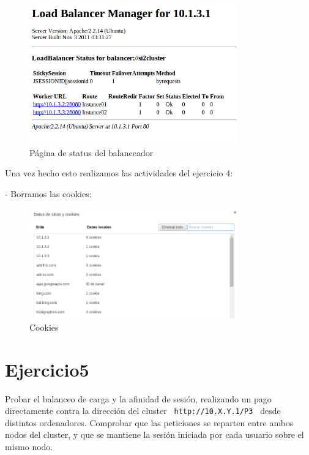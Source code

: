 \documentclass[a4paper, 10pt]{article}
\begin{document}
\begin{figure}[hbtp]
	\centering
	\includegraphics[width=0.8\textwidth]{../../P3/pantallazos/manager.png}
	\caption { Página de status del balanceador }
\end{figure}


Una vez hecho esto realizamos las actividades del ejercicio 4:

- Borramos las cookies:
\begin{figure}[hbtp]
	\centering
	\includegraphics[width=0.8\textwidth]{../../P3/pantallazos/ej4_cookies.png}
	\caption { Cookies }
\end{figure}

\newpage
\section{Ejercicio5}
\begin{mdframed}
	 Probar el balanceo de carga y la afinidad de sesión, realizando un pago directamente contra la dirección del cluster
	 \texttt{ http://10.X.Y.1/P3 }
	 desde distintos ordenadores. Comprobar que las peticiones se reparten entre ambos nodos del cluster, y
	 que se mantiene la sesión iniciada por cada usuario sobre el mismo nodo. 
\end{mdframed}
\end{document}
